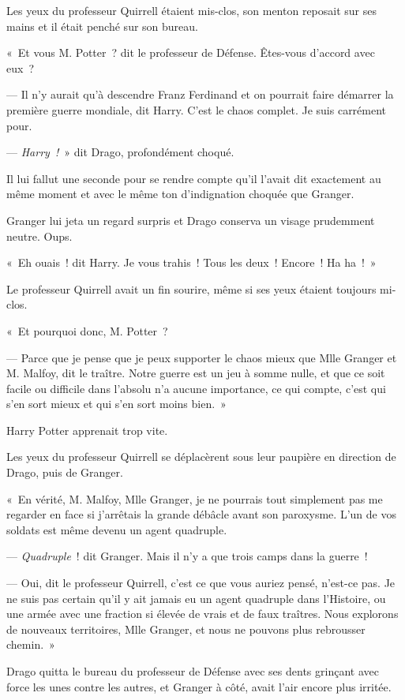 Les yeux du professeur Quirrell étaient mis-clos, son menton reposait sur ses mains et il était penché sur son bureau.

«~Et vous M. Potter~? dit le professeur de Défense. Êtes-vous d'accord avec eux~?

--- Il n'y aurait qu'à descendre Franz Ferdinand et on pourrait faire démarrer la première guerre mondiale, dit Harry. C'est le chaos complet. Je suis carrément pour.

--- \emph{Harry~!}~» dit Drago, profondément choqué.

Il lui fallut une seconde pour se rendre compte qu'il l'avait dit exactement au même moment et avec le même ton d'indignation choquée que Granger.

Granger lui jeta un regard surpris et Drago conserva un visage prudemment neutre. Oups.

«~Eh ouais~! dit Harry. Je vous trahis~! Tous les deux~! Encore~! Ha ha~!~»

Le professeur Quirrell avait un fin sourire, même si ses yeux étaient toujours mi-clos.

«~Et pourquoi donc, M. Potter~?

--- Parce que je pense que je peux supporter le chaos mieux que Mlle Granger et M. Malfoy, dit le traître. Notre guerre est un jeu à somme nulle, et que ce soit facile ou difficile dans l'absolu n'a aucune importance, ce qui compte, c'est qui s'en sort mieux et qui s'en sort moins bien.~»

Harry Potter apprenait trop vite.

Les yeux du professeur Quirrell se déplacèrent sous leur paupière en direction de Drago, puis de Granger.

«~En vérité, M. Malfoy, Mlle Granger, je ne pourrais tout simplement pas me regarder en face si j'arrêtais la grande débâcle avant son paroxysme. L'un de vos soldats est même devenu un agent quadruple.

--- \emph{Quadruple}~! dit Granger. Mais il n'y a que trois camps dans la guerre~!

--- Oui, dit le professeur Quirrell, c'est ce que vous auriez pensé, n'est-ce pas. Je ne suis pas certain qu'il y ait jamais eu un agent quadruple dans l'Histoire, ou une armée avec une fraction si élevée de vrais et de faux traîtres. Nous explorons de nouveaux territoires, Mlle Granger, et nous ne pouvons plus rebrousser chemin.~»

Drago quitta le bureau du professeur de Défense avec ses dents grinçant avec force les unes contre les autres, et Granger à côté, avait l'air encore plus irritée.

